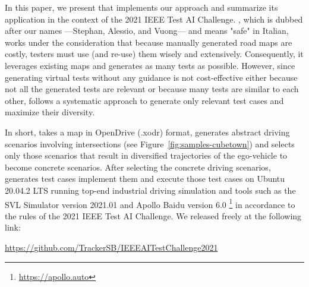\documentclass[conference]{IEEEtran}
\begin{document}
In this paper, we present \tool that implements our approach and summarize its application in the context of the 2021 IEEE Test AI Challenge.
\tool, which is dubbed after our names ---Stephan, Alessio, and Vuong--- and means "safe" in Italian, works under the consideration that because manually generated road maps are costly, testers must use (and re-use) them wisely and extensively. 
Consequently, it leverages existing maps and generates as many tests as possible.
%
However, since generating virtual tests without any guidance is not cost-effective either because not all the generated tests are relevant or because many tests are similar to each other, \tool follows a systematic approach to generate only relevant test cases and maximize their diversity.

In short, \tool takes a map in OpenDrive (.xodr) format, generates abstract driving scenarios involving intersections (see Figure~\ref{fig:samples-cubetown}) and selects only those scenarios that result in diversified trajectories of the ego-vehicle to become concrete scenarios. After selecting the concrete driving scenarios, \tool generates test cases implement them and execute those test cases on Ubuntu 20.04.2 LTS running top-end industrial driving simulation and tools such as the SVL Simulator version 2021.01 and Apollo Baidu version 6.0 \footnote{\href{https://apollo.auto/}{https://apollo.auto}} in accordance to the rules of the 2021 IEEE Test AI Challenge.
%
We released \tool freely at the following link:
\begin{center}
\href{https://github.com/TrackerSB/IEEEAITestChallenge2021}{https://github.com/TrackerSB/IEEEAITestChallenge2021}
\end{center}
\end{document}
